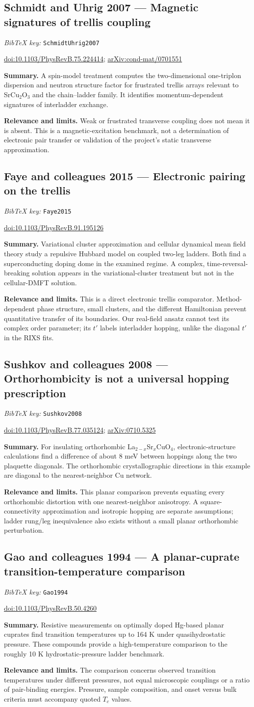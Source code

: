 \documentclass[11pt]{article}
\newcommand{\paper}[2]{\Needspace{8\baselineskip}\subsection{#2}\label{paper:#1}\textit{BibTeX key:} \texttt{#1}\quad\citep{#1}\par}
\newcommand{\doi}[1]{\href{https://doi.org/#1}{doi:#1}}
\newcommand{\arxiv}[1]{\href{https://arxiv.org/abs/#1}{arXiv:#1}}
\newcommand{\summary}{\par\textbf{Summary.} }
\newcommand{\relevance}{\par\textbf{Relevance and limits.} }
\begin{document}
\paper{SchmidtUhrig2007}{Schmidt and Uhrig 2007 --- Magnetic signatures of trellis coupling}
\doi{10.1103/PhysRevB.75.224414}; \arxiv{cond-mat/0701551}
\summary A spin-model treatment computes the two-dimensional one-triplon dispersion and neutron structure factor for frustrated trellis arrays relevant to SrCu$_2$O$_3$ and the chain--ladder family. It identifies momentum-dependent signatures of interladder exchange.
\relevance Weak or frustrated transverse coupling does not mean it is absent. This is a magnetic-excitation benchmark, not a determination of electronic pair transfer or validation of the project's static transverse approximation.

\paper{Faye2015}{Faye and colleagues 2015 --- Electronic pairing on the trellis}
\doi{10.1103/PhysRevB.91.195126}
\summary Variational cluster approximation and cellular dynamical mean field theory study a repulsive Hubbard model on coupled two-leg ladders. Both find a superconducting doping dome in the examined regime. A complex, time-reversal-breaking solution appears in the variational-cluster treatment but not in the cellular-DMFT solution.
\relevance This is a direct electronic trellis comparator. Method-dependent phase structure, small clusters, and the different Hamiltonian prevent quantitative transfer of its boundaries. Our real-field ansatz cannot test its complex order parameter; its $t'$ labels interladder hopping, unlike the diagonal $t'$ in the RIXS fits.

\paper{Sushkov2008}{Sushkov and colleagues 2008 --- Orthorhombicity is not a universal hopping prescription}
\doi{10.1103/PhysRevB.77.035124}; \arxiv{0710.5325}
\summary For insulating orthorhombic La$_{2-x}$Sr$_x$CuO$_4$, electronic-structure calculations find a difference of about 8 meV between hoppings along the two plaquette diagonals. The orthorhombic crystallographic directions in this example are diagonal to the nearest-neighbor Cu network.
\relevance This planar comparison prevents equating every orthorhombic distortion with one nearest-neighbor anisotropy. A square-connectivity approximation and isotropic hopping are separate assumptions; ladder rung/leg inequivalence also exists without a small planar orthorhombic perturbation.

\paper{Gao1994}{Gao and colleagues 1994 --- A planar-cuprate transition-temperature comparison}
\doi{10.1103/PhysRevB.50.4260}
\summary Resistive measurements on optimally doped Hg-based planar cuprates find transition temperatures up to 164 K under quasihydrostatic pressure. These compounds provide a high-temperature comparison to the roughly 10 K hydrostatic-pressure ladder benchmark.
\relevance The comparison concerns observed transition temperatures under different pressures, not equal microscopic couplings or a ratio of pair-binding energies. Pressure, sample composition, and onset versus bulk criteria must accompany quoted $T_c$ values.
\end{document}
